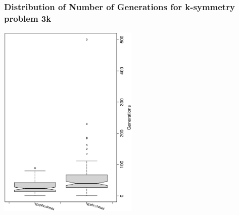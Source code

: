  \begin{frame}
 \frametitle{ Distribution of Number of Generations for k-symmetry problem 3k }
 \begin{center}
\includegraphics[width=0.5\textwidth, angle=-90]
{ExpDboxplottGenerations001.eps}
 \end{center}
 \label{ExpDboxplottGenerations001.eps}  
 \end{frame}

